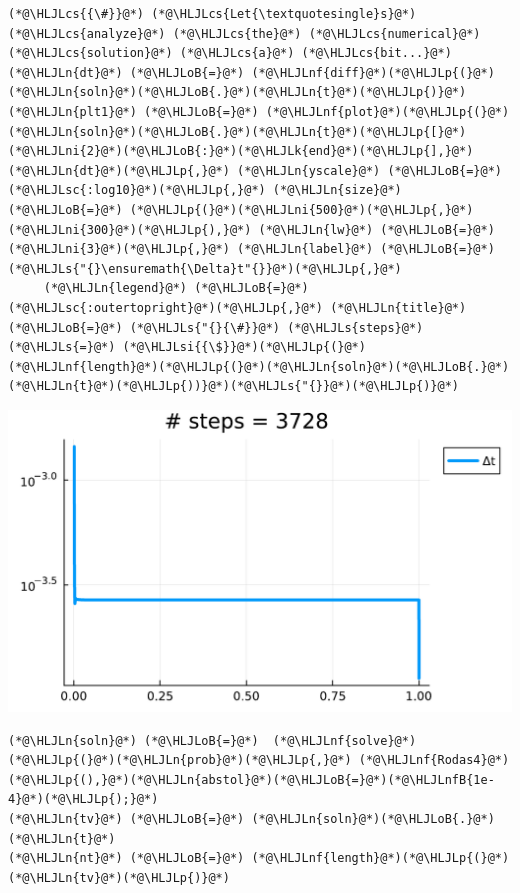 \documentclass[12pt,a4paper]{article}
\newcommand{\HLJLk}[1]{\textcolor[RGB]{148,91,176}{\textbf{#1}}}
\newcommand{\HLJLn}[1]{#1}
\newcommand{\HLJLnf}[1]{\textcolor[RGB]{66,102,213}{#1}}
\newcommand{\HLJLs}[1]{\textcolor[RGB]{201,61,57}{#1}}
\newcommand{\HLJLsc}[1]{\textcolor[RGB]{201,61,57}{#1}}
\newcommand{\HLJLsi}[1]{#1}
\newcommand{\HLJLnfB}[1]{\textcolor[RGB]{59,151,46}{#1}}
\newcommand{\HLJLni}[1]{\textcolor[RGB]{59,151,46}{#1}}
\newcommand{\HLJLoB}[1]{\textcolor[RGB]{102,102,102}{\textbf{#1}}}
\newcommand{\HLJLp}[1]{#1}
\newcommand{\HLJLcs}[1]{\textcolor[RGB]{153,153,119}{\textit{#1}}}
\begin{document}
\begin{lstlisting}
(*@\HLJLcs{{\#}}@*) (*@\HLJLcs{Let{\textquotesingle}s}@*) (*@\HLJLcs{analyze}@*) (*@\HLJLcs{the}@*) (*@\HLJLcs{numerical}@*) (*@\HLJLcs{solution}@*) (*@\HLJLcs{a}@*) (*@\HLJLcs{bit...}@*)
(*@\HLJLn{dt}@*) (*@\HLJLoB{=}@*) (*@\HLJLnf{diff}@*)(*@\HLJLp{(}@*)(*@\HLJLn{soln}@*)(*@\HLJLoB{.}@*)(*@\HLJLn{t}@*)(*@\HLJLp{)}@*)
(*@\HLJLn{plt1}@*) (*@\HLJLoB{=}@*) (*@\HLJLnf{plot}@*)(*@\HLJLp{(}@*)(*@\HLJLn{soln}@*)(*@\HLJLoB{.}@*)(*@\HLJLn{t}@*)(*@\HLJLp{[}@*)(*@\HLJLni{2}@*)(*@\HLJLoB{:}@*)(*@\HLJLk{end}@*)(*@\HLJLp{],}@*) (*@\HLJLn{dt}@*)(*@\HLJLp{,}@*) (*@\HLJLn{yscale}@*) (*@\HLJLoB{=}@*) (*@\HLJLsc{:log10}@*)(*@\HLJLp{,}@*) (*@\HLJLn{size}@*) (*@\HLJLoB{=}@*) (*@\HLJLp{(}@*)(*@\HLJLni{500}@*)(*@\HLJLp{,}@*) (*@\HLJLni{300}@*)(*@\HLJLp{),}@*) (*@\HLJLn{lw}@*) (*@\HLJLoB{=}@*) (*@\HLJLni{3}@*)(*@\HLJLp{,}@*) (*@\HLJLn{label}@*) (*@\HLJLoB{=}@*) (*@\HLJLs{"{}\ensuremath{\Delta}t"{}}@*)(*@\HLJLp{,}@*) 
     (*@\HLJLn{legend}@*) (*@\HLJLoB{=}@*) (*@\HLJLsc{:outertopright}@*)(*@\HLJLp{,}@*) (*@\HLJLn{title}@*) (*@\HLJLoB{=}@*) (*@\HLJLs{"{}{\#}}@*) (*@\HLJLs{steps}@*) (*@\HLJLs{=}@*) (*@\HLJLsi{{\$}}@*)(*@\HLJLp{(}@*)(*@\HLJLnf{length}@*)(*@\HLJLp{(}@*)(*@\HLJLn{soln}@*)(*@\HLJLoB{.}@*)(*@\HLJLn{t}@*)(*@\HLJLp{))}@*)(*@\HLJLs{"{}}@*)(*@\HLJLp{)}@*)
\end{lstlisting}

\includegraphics[width=\linewidth]{jl_Vz6qXN/Chapter5_26_1.pdf}

\begin{lstlisting}
(*@\HLJLn{soln}@*) (*@\HLJLoB{=}@*)  (*@\HLJLnf{solve}@*)(*@\HLJLp{(}@*)(*@\HLJLn{prob}@*)(*@\HLJLp{,}@*) (*@\HLJLnf{Rodas4}@*)(*@\HLJLp{(),}@*)(*@\HLJLn{abstol}@*)(*@\HLJLoB{=}@*)(*@\HLJLnfB{1e-4}@*)(*@\HLJLp{);}@*)
(*@\HLJLn{tv}@*) (*@\HLJLoB{=}@*) (*@\HLJLn{soln}@*)(*@\HLJLoB{.}@*)(*@\HLJLn{t}@*)
(*@\HLJLn{nt}@*) (*@\HLJLoB{=}@*) (*@\HLJLnf{length}@*)(*@\HLJLp{(}@*)(*@\HLJLn{tv}@*)(*@\HLJLp{)}@*)
\end{lstlisting}
\end{document}
